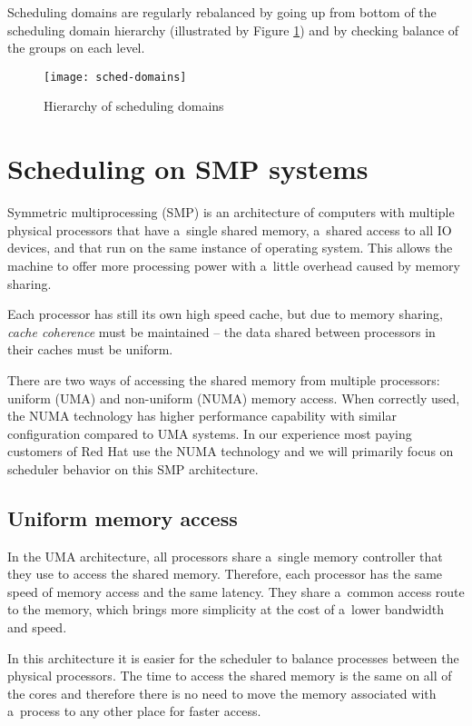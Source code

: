 Scheduling domains are regularly rebalanced by going up from bottom of the
scheduling domain hierarchy (illustrated by Figure \ref{fig:sched-domains}) and
by checking balance of the groups on each level.

\begin{figure}
  \centering
  \texttt{[image: sched-domains]}
  \caption{Hierarchy of scheduling domains\cite{sched-groups-lwn}}
  \label{fig:sched-domains}
\end{figure}

\section{Scheduling on SMP systems}
Symmetric multiprocessing (SMP) is an architecture of computers with multiple
physical processors that have a~single shared memory, a~shared access to all IO
devices, and that run on the same instance of operating system. This allows the
machine to offer more processing power with a~little overhead caused by memory
sharing.

Each processor has still its own high speed cache, but due to memory sharing,
\emph{cache coherence} must be maintained -- the data shared between processors
in their caches must be uniform.

There are two ways of accessing the shared memory from multiple processors:
uniform (UMA) and non-uniform (NUMA) memory access. When correctly used, the
NUMA technology has higher performance capability with similar configuration
compared to UMA systems. In our experience most paying customers of Red Hat use
the NUMA technology and we will primarily focus on scheduler behavior on this
SMP architecture.

\subsection{Uniform memory access}
In the UMA architecture, all processors share a~single memory controller that
they use to access the shared memory. Therefore, each processor has the same
speed of memory access and the same latency. They share a~common access route to
the memory, which brings more simplicity at the cost of a~lower bandwidth and
speed.

In this architecture it is easier for the scheduler to balance processes
between the physical processors. The time to access the shared memory is the
same on all of the cores and therefore there is no need to move the memory
associated with a~process to any other place for faster access.

